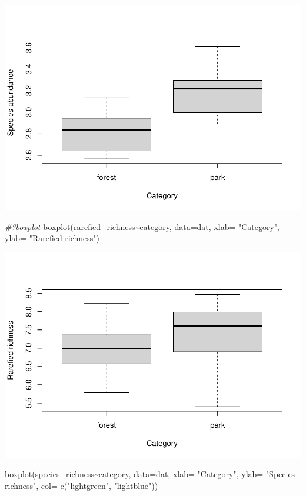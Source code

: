 \documentclass[
]{article}
\newenvironment{Shaded}{\begin{snugshade}}{\end{snugshade}}
\newcommand{\AttributeTok}[1]{\textcolor[rgb]{0.77,0.63,0.00}{#1}}
\newcommand{\CommentTok}[1]{\textcolor[rgb]{0.56,0.35,0.01}{\textit{#1}}}
\newcommand{\FunctionTok}[1]{\textcolor[rgb]{0.00,0.00,0.00}{#1}}
\newcommand{\NormalTok}[1]{#1}
\newcommand{\SpecialCharTok}[1]{\textcolor[rgb]{0.00,0.00,0.00}{#1}}
\newcommand{\StringTok}[1]{\textcolor[rgb]{0.31,0.60,0.02}{#1}}
\begin{document}
\includegraphics{birdsdataanalysis_files/figure-latex/unnamed-chunk-6-2.pdf}

\begin{Shaded}
\begin{Highlighting}[]
\CommentTok{\#?boxplot}
\FunctionTok{boxplot}\NormalTok{(rarefied\_richness}\SpecialCharTok{\textasciitilde{}}\NormalTok{category, }\AttributeTok{data=}\NormalTok{dat, }\AttributeTok{xlab=} \StringTok{"Category"}\NormalTok{, }\AttributeTok{ylab=} \StringTok{"Rarefied richness"}\NormalTok{)}
\end{Highlighting}
\end{Shaded}

\includegraphics{birdsdataanalysis_files/figure-latex/unnamed-chunk-6-3.pdf}

\begin{Shaded}
\begin{Highlighting}[]
\FunctionTok{boxplot}\NormalTok{(species\_richness}\SpecialCharTok{\textasciitilde{}}\NormalTok{category, }\AttributeTok{data=}\NormalTok{dat, }\AttributeTok{xlab=} \StringTok{"Category"}\NormalTok{, }\AttributeTok{ylab=} \StringTok{"Species richness"}\NormalTok{, }\AttributeTok{col=} \FunctionTok{c}\NormalTok{(}\StringTok{"lightgreen"}\NormalTok{, }\StringTok{"lightblue"}\NormalTok{))}
\end{Highlighting}
\end{Shaded}
\end{document}
